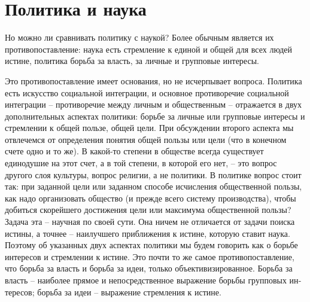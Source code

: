 \documentclass{book}
\begin{document}
\section{Политика и наука}

Но можно ли сравнивать политику с наукой? Более обычным является их противопоставление: наука есть стремление к единой и общей для всех людей истине, политика борьба за власть, за личные и групповые интересы.

Это противопоставление имеет основания, но не исчерпывает вопроса. Политика есть искусство социальной интеграции, и основное противоречие социальной интеграции -- противоречие между личным и общественным -- отражается в двух дополнительных аспектах политики: борьбе за личные или групповые интересы и стремлении к общей пользе, общей цели. При обсуждении второго аспекта мы отвлечемся от определения понятия общей пользы или цели (что в конечном счете одно и то же). В какой-то степени в обществе всегда существует единодушие на этот счет, а в той степени, в которой его нет, -- это вопрос другого слоя культуры, вопрос религии, а не политики. В политике вопрос стоит так: при заданной цели или заданном способе исчисления общественной пользы, как надо организовать общество (и прежде всего систему производства), чтобы добиться скорейшего достижения цели или максимума общественной пользы? Задача эта -- научная по своей сути. Она ничем не отличается от задачи поиска истины, а точнее -- наилучшего приближения к истине, 
которую ставит наука. Поэтому об указанных двух аспектах политики мы будем говорить как о борьбе интересов  и стремлении к истине.  Это почти то же самое противопоставление, что борьба за власть и борьба за идеи, только объективизированное. Борьба за власть -- наиболее прямое и непосредственное выражение борьбы групповых ин­тересов; борьба за идеи -- выражение стремления к истине.
\end{document}

